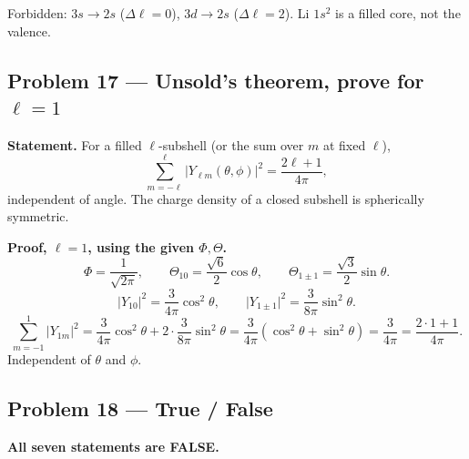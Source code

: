 \documentclass[11pt,a4paper]{article}
\begin{document}
Forbidden: \(3s\to 2s\) (\(\Delta\ell=0\)), \(3d\to 2s\) (\(\Delta\ell=2\)). Li \(1s^2\) is a filled core, not the valence.

\subsection{Problem 17 --- Unsold's theorem, prove for \(\ell=1\)}
\textbf{Statement.} For a filled \(\ell\)-subshell (or the sum over \(m\) at fixed \(\ell\)),
\[
\sum_{m=-\ell}^{\ell}\lvert Y_{\ell m}(\theta,\phi)\rvert^2=\frac{2\ell+1}{4\pi},
\]
independent of angle. The charge density of a closed subshell is spherically symmetric.

\textbf{Proof, \(\ell=1\), using the given \(\Phi,\Theta\).}
\[
\Phi=\frac{1}{\sqrt{2\pi}},\qquad
\Theta_{10}=\frac{\sqrt{6}}{2}\cos\theta,\qquad
\Theta_{1\pm 1}=\frac{\sqrt{3}}{2}\sin\theta.
\]
\[
\lvert Y_{10}\rvert^2=\frac{3}{4\pi}\cos^2\theta,\qquad
\lvert Y_{1\pm 1}\rvert^2=\frac{3}{8\pi}\sin^2\theta.
\]
\[
\sum_{m=-1}^{1}\lvert Y_{1m}\rvert^2
=\frac{3}{4\pi}\cos^2\theta+2\cdot\frac{3}{8\pi}\sin^2\theta
=\frac{3}{4\pi}(\cos^2\theta+\sin^2\theta)
=\frac{3}{4\pi}
=\frac{2\cdot 1+1}{4\pi}.
\]
Independent of \(\theta\) and \(\phi\).

\subsection{Problem 18 --- True / False}
\textbf{All seven statements are FALSE.}
\end{document}
